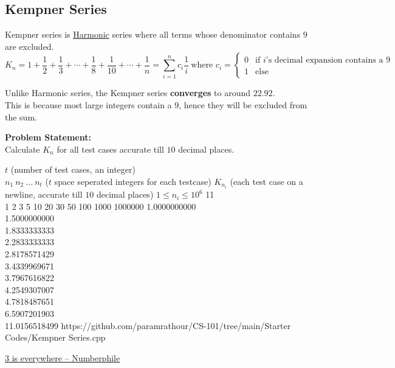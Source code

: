 \documentclass[../../Problems]{subfiles}
\begin{document}
\subsection{Kempner Series}
Kempner series is \hyperref[pp:harmonic]{Harmonic} series where all terms whose denominator contains $9$ are excluded.
\begin{equation}
{K_{n}=1+{\frac {1}{2}}+{\frac {1}{3}}+\cdots+{\frac {1}{8}}+{\frac {1}{10}}+\cdots +{\frac {1}{n}}=\sum _{i=1}^{n}c_i{\frac {1}{i}}} \ \text{where } c_i = \begin{cases} 
      0 & \text{if $i$'s decimal expansion contains a }9\\
      1 & \text{else}
   \end{cases}
\end{equation}
\begin{fact}
Unlike Harmonic series, the Kempner series \textbf{converges} to around $22.92$.\\This is because most large integers contain a $9$, hence they will be excluded from the sum.
\end{fact}
\textbf{Problem Statement:}\\
Calculate $K_n$ for all test cases accurate till $10$ decimal places.
\begin{testcases}
	{$t$ \hfill(number of test cases, an integer)\\
	$n_1\ n_2\ \ldots\ n_t$ \hfill($t$ space seperated integers for each testcase)}
	{$K_{n_i}$ \hfill(each test case on a newline, accurate till $10$ decimal places)}
	{$1 \leq n_i \leq 10^{6}$}
	{11\\1 2 3 5 10 20 30 50 100 1000 1000000}
	{1.0000000000\\1.5000000000\\1.8333333333\\2.2833333333\\2.8178571429\\3.4339969671\\3.7967616822\\4.2549307007\\4.7818487651\\6.5907201903\\11.0156518499}
	{https://github.com/paramrathour/CS-101/tree/main/Starter Codes/Kempner Series.cpp}
\end{testcases}
\begin{funvideo}
\href{https://youtu.be/UfEiJJGv4CE}{3 is everywhere -- Numberphile}
\end{funvideo}
\end{document}
